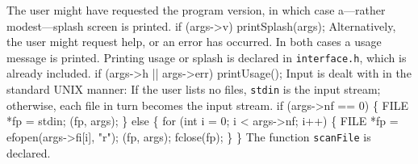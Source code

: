 \nwendcode{}\nwdocspar
The user might have requested the
program version, in which case a---rather modest---splash screen is
printed.
\nwenddocs{}\endmoddef\nwstartdeflinemarkup{}\nwenddeflinemarkup
if (args->v)
  printSplash(args);
\nwendcode{}\nwdocspar
Alternatively, the user might request help, or an error has
occurred. In both cases a usage message is printed. Printing
usage or splash is declared in \texttt{interface.h}, which is already included.
\nwenddocs{}\plusendmoddef\nwstartdeflinemarkup{}\nwenddeflinemarkup
if (args->h || args->err)
  printUsage();
\nwendcode{}\nwdocspar
Input is dealt with in the standard UNIX manner: If the user lists no
files, \texttt{stdin} is the input stream; otherwise, each file in
turn becomes the input stream.
\nwenddocs{}\endmoddef\nwstartdeflinemarkup{}\nwenddeflinemarkup
if (args->nf == 0) \{
  FILE *fp = stdin;
  (fp, args);
\} else \{
  for (int i = 0; i < args->nf; i++) \{
    FILE *fp = efopen(args->fi[i], "r");
    (fp, args);
    fclose(fp);
  \}
\}
\nwendcode{}\nwdocspar
The function \texttt{scanFile} is declared.
